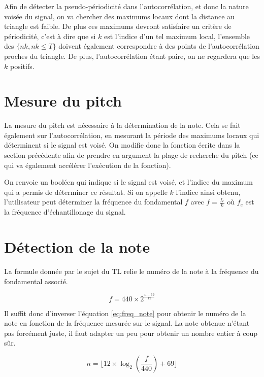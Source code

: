 \documentclass[french]{article}
\begin{document}
Afin de détecter la pseudo-périodicité dans l'autocorrélation, et donc la nature voisée du signal, on va chercher des maximums locaux dont la distance au triangle est faible. De plus ces maximums devront satisfaire un critère de périodicité, c'est à dire que si $k$ est l'indice d'un tel maximum local, l'ensemble des $\{nk, nk \leq T\}$ doivent également correspondre à des points de l'autocorrélation proches du triangle. De plus, l'autocorrélation étant paire, on ne regardera que les $k$ positifs.

\section{Mesure du pitch}

La mesure du pitch est nécessaire à la détermination de la note. Cela se fait également sur l'autocorrélation, en mesurant la période des maximums locaux qui déterminent si le signal est voisé. On modifie donc la fonction écrite dans la section précédente afin de prendre en argument la plage de recherche du pitch (ce qui va également accélérer l'exécution de la fonction). 

On renvoie un booléen qui indique si le signal est voisé, et l'indice du maximum qui a permis de déterminer ce résultat. Si on appelle $k$ l'indice ainsi obtenu, l'utilisateur peut déterminer la fréquence du fondamental $f$ avec $f = \frac{f_e}{k}$ où $f_e$ est la fréquence d'échantillonage du signal.

\section{Détection de la note}

La formule donnée par le sujet du TL relie le numéro de la note à la fréquence du fondamental associé.

\begin{equation}
f = 440 \times 2 ^{\frac{n - 69}{12}}
\label{eq:freq_note}
\end{equation}

Il suffit donc d'inverser l'équation \ref{eq:freq_note} pour obtenir le numéro de la note en fonction de la fréquence mesurée sur le signal. La note obtenue n'étant pas forcément juste, il faut adapter un peu pour obtenir un nombre entier à coup sûr.

\begin{equation}
n = \lfloor 12 \times \log_2\left(\frac{f}{440}\right) + 69 \rfloor
\end{equation}
\end{document}
